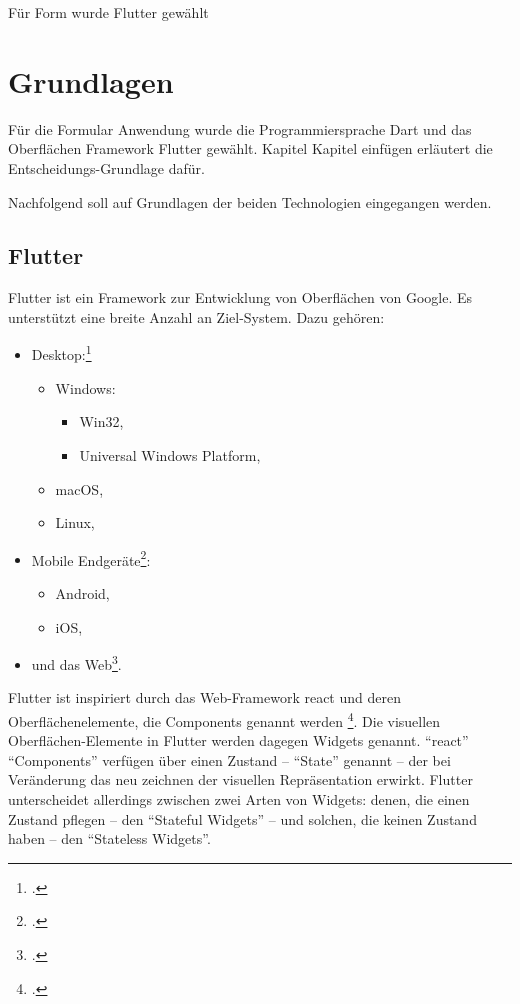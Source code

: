 
Für Form wurde Flutter gewählt

\section{Grundlagen}

Für die Formular Anwendung wurde die Programmiersprache Dart und das Oberflächen Framework Flutter gewählt. Kapitel Kapitel einfügen  erläutert die Entscheidungs-Grundlage dafür.

Nachfolgend soll auf  Grundlagen der beiden Technologien eingegangen werden.

\subsection{Flutter}

Flutter ist ein Framework zur Entwicklung von Oberflächen von Google.
Es unterstützt eine breite Anzahl an Ziel-System.  Dazu gehören:

\begin{itemize}
    \item Desktop:\footcite[Vgl.][]{DesktopSupportForFlutter}
          \begin{itemize}
              \item Windows:
                    \begin{itemize}
                        \item Win32,
                        \item Universal Windows Platform,
                    \end{itemize}
              \item macOS,
              \item Linux,
          \end{itemize}
    \item Mobile Endgeräte\footcite[Vgl.][]{FlutterBeautifulNativeAppsInRecordTime}:
          \begin{itemize}
              \item Android,
              \item iOS,
          \end{itemize}
    \item und das Web\footcite[Vgl.][]{WebSupportForFlutter}.
\end{itemize}

Flutter ist inspiriert durch das Web-Framework react und deren Oberflächenelemente, die Components genannt werden \footcite[Vgl.][]{IntroductionToWidgets}. Die visuellen Oberflächen-Elemente in Flutter werden dagegen Widgets genannt. \enquote{react} \enquote{Components} verfügen über einen Zustand – \enquote{State} genannt – der bei Veränderung das neu zeichnen der visuellen Repräsentation erwirkt. Flutter unterscheidet allerdings zwischen zwei Arten von Widgets: denen, die einen Zustand pflegen – den \enquote{Stateful Widgets} – und solchen, die keinen Zustand haben – den \enquote{Stateless Widgets}.

